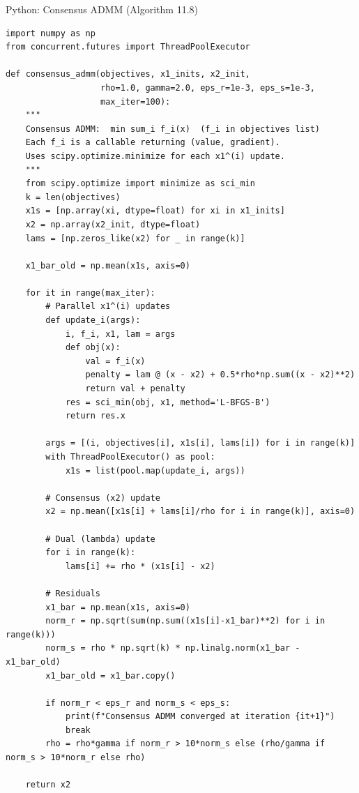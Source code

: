 \documentclass[aspectratio=169,10pt]{beamer}
\begin{document}
\begin{frame}[fragile]{Python: Consensus ADMM (Algorithm 11.8)}
\begin{lstlisting}[style=python]
import numpy as np
from concurrent.futures import ThreadPoolExecutor

def consensus_admm(objectives, x1_inits, x2_init,
                   rho=1.0, gamma=2.0, eps_r=1e-3, eps_s=1e-3,
                   max_iter=100):
    """
    Consensus ADMM:  min sum_i f_i(x)  (f_i in objectives list)
    Each f_i is a callable returning (value, gradient).
    Uses scipy.optimize.minimize for each x1^(i) update.
    """
    from scipy.optimize import minimize as sci_min
    k = len(objectives)
    x1s = [np.array(xi, dtype=float) for xi in x1_inits]
    x2 = np.array(x2_init, dtype=float)
    lams = [np.zeros_like(x2) for _ in range(k)]

    x1_bar_old = np.mean(x1s, axis=0)

    for it in range(max_iter):
        # Parallel x1^(i) updates
        def update_i(args):
            i, f_i, x1, lam = args
            def obj(x):
                val = f_i(x)
                penalty = lam @ (x - x2) + 0.5*rho*np.sum((x - x2)**2)
                return val + penalty
            res = sci_min(obj, x1, method='L-BFGS-B')
            return res.x

        args = [(i, objectives[i], x1s[i], lams[i]) for i in range(k)]
        with ThreadPoolExecutor() as pool:
            x1s = list(pool.map(update_i, args))

        # Consensus (x2) update
        x2 = np.mean([x1s[i] + lams[i]/rho for i in range(k)], axis=0)

        # Dual (lambda) update
        for i in range(k):
            lams[i] += rho * (x1s[i] - x2)

        # Residuals
        x1_bar = np.mean(x1s, axis=0)
        norm_r = np.sqrt(sum(np.sum((x1s[i]-x1_bar)**2) for i in range(k)))
        norm_s = rho * np.sqrt(k) * np.linalg.norm(x1_bar - x1_bar_old)
        x1_bar_old = x1_bar.copy()

        if norm_r < eps_r and norm_s < eps_s:
            print(f"Consensus ADMM converged at iteration {it+1}")
            break
        rho = rho*gamma if norm_r > 10*norm_s else (rho/gamma if norm_s > 10*norm_r else rho)

    return x2
\end{lstlisting}
\end{frame}
\end{document}
